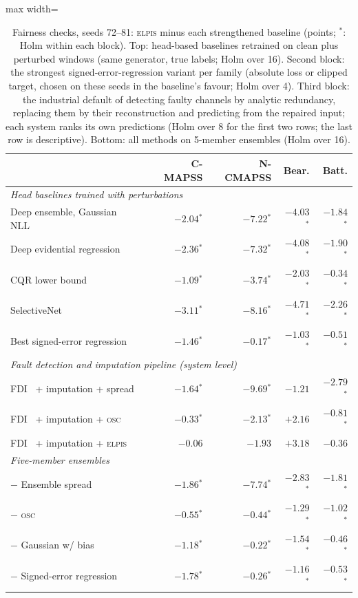 \documentclass{esannV2}
\newcommand{\OSC}{\textsc{osc}}
\newcommand{\RPT}{\textsc{elpis}}
\newcommand{\s}{$^{\ast}$}
\begin{document}
\begin{table}[!htbp]
\caption{Fairness checks, seeds 72--81: \RPT{} minus each strengthened baseline (points; \s: Holm within each block). Top: head-based baselines retrained on clean plus perturbed windows (same generator, true labels; Holm over 16). Second block: the strongest signed-error-regression variant per family (absolute loss or clipped target, chosen on these seeds in the baseline's favour; Holm over 4). Third block: the industrial default of detecting faulty channels by analytic redundancy, replacing them by their reconstruction and predicting from the repaired input; each system ranks its own predictions (Holm over 8 for the first two rows; the last row is descriptive). Bottom: all methods on 5-member ensembles (Holm over 16).}
\label{tab:fair}
\centering\footnotesize
\begin{adjustbox}{max width=\textwidth}\begin{tabular}{lrrrr}
\toprule
 & C-MAPSS & N-CMAPSS & Bear. & Batt.\\
\midrule
\multicolumn{5}{l}{\emph{Head baselines trained with perturbations}}\\
Deep ensemble, Gaussian NLL~\cite{lakshminarayanan2017simple} & $-2.04$\s & $-7.22$\s & $-4.03$\s & $-1.84$\s\\
Deep evidential regression~\cite{amini2020deep} & $-2.36$\s & $-7.32$\s & $-4.08$\s & $-1.90$\s\\
CQR lower bound~\cite{romano2019cqr} & $-1.09$\s & $-3.74$\s & $-2.03$\s & $-0.34$\s\\
SelectiveNet~\cite{geifman2019selectivenet} & $-3.11$\s & $-8.16$\s & $-4.71$\s & $-2.26$\s\\
\midrule
Best signed-error regression~\cite{yoo2019learning} & $-1.46$\s & $-0.17$\s & $-1.03$\s & $-0.51$\s\\
\midrule
\multicolumn{5}{l}{\emph{Fault detection and imputation pipeline (system level)}}\\
FDI~\cite{chow1984analytical} + imputation + spread~\cite{lakshminarayanan2017simple} & $-1.64$\s & $-9.69$\s & $-1.21$ & $-2.79$\s\\
FDI~\cite{chow1984analytical} + imputation + \OSC & $-0.33$\s & $-2.13$\s & $+2.16$ & $-0.81$\s\\
FDI~\cite{chow1984analytical} + imputation + \RPT{} & $-0.06$ & $-1.93$ & $+3.18$ & $-0.36$\\
\midrule
\multicolumn{5}{l}{\emph{Five-member ensembles}}\\
$-$ Ensemble spread~\cite{lakshminarayanan2017simple} & $-1.86$\s & $-7.74$\s & $-2.83$\s & $-1.81$\s\\
$-$ \OSC & $-0.55$\s & $-0.44$\s & $-1.29$\s & $-1.02$\s\\
$-$ Gaussian w/ bias~\cite{nix1994estimating} & $-1.18$\s & $-0.22$\s & $-1.54$\s & $-0.46$\s\\
$-$ Signed-error regression~\cite{yoo2019learning} & $-1.78$\s & $-0.26$\s & $-1.16$\s & $-0.53$\s\\
\bottomrule
\end{tabular}\end{adjustbox}
\end{table}
\end{document}
